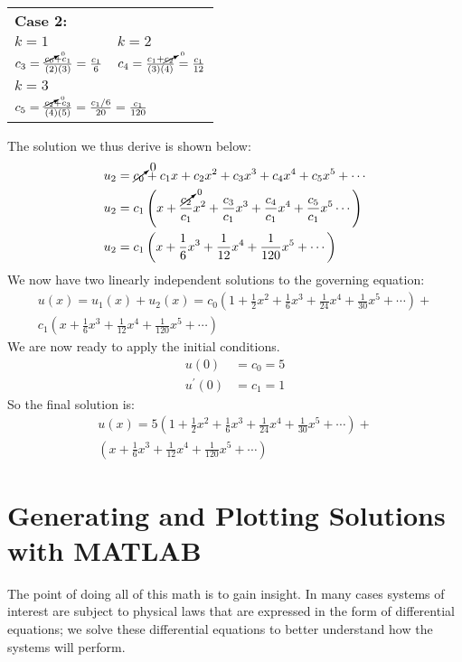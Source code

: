 \begin{margintable}
\begin{tabular}{l | l}
\multicolumn{2}{l}{\textbf{Case 2:}} \\
$k=1$ & $k=2$ \\
$c_3 = \frac{\cancelto{0}{c_0}+c_1}{(2)(3)} = \frac{c_1}{6}$ & $c_4 = \frac{c_1 + \cancelto{0}{c_2}}{(3)(4)} = \frac{c_1}{12}$\\\hline
\multicolumn{2}{l}{$k=3$} \\
\multicolumn{2}{l}{$c_5 = \frac{\cancelto{0}{c_2}+c_3}{(4)(5)} = \frac{c_1/6}{20} = \frac{c_1}{120}$}\\
\end{tabular}
\end{margintable}
The solution we thus derive is shown below:
\begin{align*}
u_2 &= \cancelto{0}{c_0} + c_1x + c_2x^2 + c_3x^3 + c_4x^4 + c_5x^5 + \cdots \\
u_2 &= c_1 \left(x + \frac{\cancelto{0}{c_2}}{c_1}x^2 + \frac{c_3}{c_1}x^3 + \frac{c_4}{c_1}x^4 + \frac{c_5}{c_1}x^5 \cdots \right) \\
u_2 &= c_1 \left(x+\frac{1}{6}x^3 + \frac{1}{12}x^4 + \frac{1}{120}x^5 + \cdots \right)
\end{align*}
We now have two linearly independent solutions to the governing equation:
\begin{multline*}
u(x) = u_1(x) + u_2(x) = c_0\left(1 + \frac{1}{2}x^2 + \frac{1}{6}x^3 + \frac{1}{24}x^4 + \frac{1}{30}x^5 + \cdots \right) + \\ 
c_1\left(x + \frac{1}{6}x^3 + \frac{1}{12}x^4 + \frac{1}{120}x^5 + \cdots \right)
\end{multline*}
We are now ready to apply the initial conditions.  
\begin{align*}
u(0) &= c_0 = 5 \\
u^{\prime}(0) &= c_1 = 1
\end{align*}
So the final solution is:
\begin{multline*}
u(x)= 5\left(1 + \frac{1}{2}x^2 + \frac{1}{6}x^3 + \frac{1}{24}x^4 + \frac{1}{30}x^5 + \cdots \right) + \\ 
\left(x + \frac{1}{6}x^3 + \frac{1}{12}x^4 + \frac{1}{120}x^5 + \cdots \right)
\end{multline*}

\section{Generating and Plotting Solutions with MATLAB}
The point of doing all of this math is to gain insight.  In many cases systems of interest are subject to physical laws that are expressed in the form of differential equations; we solve these differential equations to better understand how the systems will perform.  

